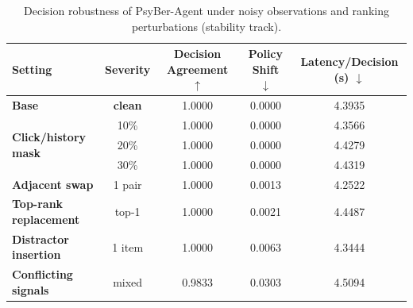 \begin{table}[ht]
\caption{Decision robustness of PsyBer-Agent under noisy observations and ranking perturbations (stability track).}
\label{tab:decision_robustness}
\centering
\small
\begin{tabular}{lcccc}
\toprule
\textbf{Setting} & \textbf{Severity}
& \textbf{Decision Agreement $\uparrow$} & \textbf{Policy Shift $\downarrow$} & \textbf{Latency/Decision (s) $\downarrow$} \\
\midrule
\textbf{Base} & \textbf{clean} & 1.0000 & 0.0000 & 4.3935 \\
\hline
\multirow{3}{*}{\textbf{Click/history mask}} & 10\% & 1.0000 & 0.0000 & 4.3566 \\
                                             & 20\% & 1.0000 & 0.0000 & 4.4279 \\
                                             & 30\% & 1.0000 & 0.0000 & 4.4319 \\
\hline
\textbf{Adjacent swap} & 1 pair & 1.0000 & 0.0013 & 4.2522 \\
\textbf{Top-rank replacement} & top-1 & 1.0000 & 0.0021 & 4.4487 \\
\textbf{Distractor insertion} & 1 item & 1.0000 & 0.0063 & 4.3444 \\
\textbf{Conflicting signals} & mixed & 0.9833 & 0.0303 & 4.5094 \\
\bottomrule
\end{tabular}
\end{table}
